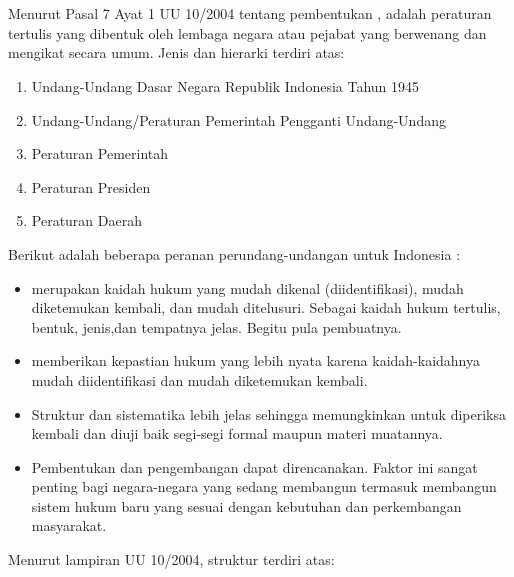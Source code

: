 \section{\Legal}
\label{sec:legal}

Menurut Pasal 7 Ayat 1 UU 10/2004 tentang pembentukan \legal, \legal adalah peraturan tertulis yang
dibentuk oleh lembaga negara atau pejabat yang berwenang dan mengikat secara umum. Jenis dan
hierarki \legal terdiri atas:

\begin{enumerate}
  \item Undang-Undang Dasar Negara Republik Indonesia Tahun 1945
  \item Undang-Undang/Peraturan Pemerintah Pengganti Undang-Undang
  \item Peraturan Pemerintah
  \item Peraturan Presiden
  \item Peraturan Daerah
\end{enumerate}

Berikut adalah beberapa peranan perundang-undangan untuk Indonesia \citep{ilmu_perundang_undangan}:

\begin{itemize}
  \item \Legal merupakan kaidah hukum yang mudah dikenal (diidentifikasi),
        mudah diketemukan kembali, dan mudah ditelusuri. Sebagai kaidah hukum tertulis, bentuk,
        jenis,dan tempatnya jelas. Begitu pula pembuatnya.
  \item \Legal memberikan kepastian hukum yang lebih nyata karena
        kaidah-kaidahnya mudah diidentifikasi dan mudah diketemukan kembali.
  \item Struktur dan sistematika \legal lebih jelas sehingga memungkinkan
        untuk diperiksa kembali dan diuji baik segi-segi formal maupun materi muatannya.
  \item Pembentukan dan pengembangan \legal dapat direncanakan. Faktor ini
        sangat penting bagi negara-negara yang sedang membangun termasuk membangun sistem hukum baru yang
        sesuai dengan kebutuhan dan perkembangan masyarakat.
\end{itemize}

Menurut lampiran UU 10/2004, struktur \legal terdiri atas:

